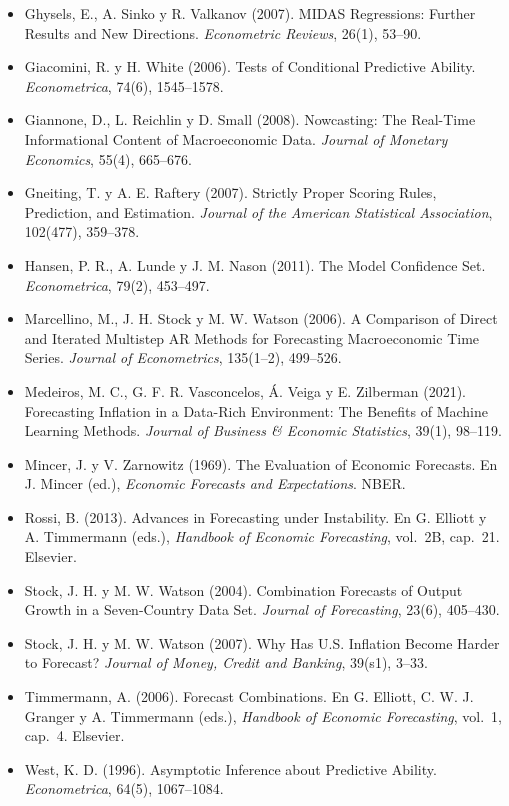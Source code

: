 \documentclass[11pt,a4paper]{article}
\begin{document}
{\begin{itemize}[leftmargin=1.4em,itemsep=1pt,label={}]
\item Ghysels, E., A. Sinko y R. Valkanov (2007). MIDAS Regressions: Further Results and New Directions. \emph{Econometric Reviews}, 26(1), 53--90.
\item Giacomini, R. y H. White (2006). Tests of Conditional Predictive Ability. \emph{Econometrica}, 74(6), 1545--1578.
\item Giannone, D., L. Reichlin y D. Small (2008). Nowcasting: The Real-Time Informational Content of Macroeconomic Data. \emph{Journal of Monetary Economics}, 55(4), 665--676.
\item Gneiting, T. y A. E. Raftery (2007). Strictly Proper Scoring Rules, Prediction, and Estimation. \emph{Journal of the American Statistical Association}, 102(477), 359--378.
\item Hansen, P. R., A. Lunde y J. M. Nason (2011). The Model Confidence Set. \emph{Econometrica}, 79(2), 453--497.
\item Marcellino, M., J. H. Stock y M. W. Watson (2006). A Comparison of Direct and Iterated Multistep AR Methods for Forecasting Macroeconomic Time Series. \emph{Journal of Econometrics}, 135(1--2), 499--526.
\item Medeiros, M. C., G. F. R. Vasconcelos, Á. Veiga y E. Zilberman (2021). Forecasting Inflation in a Data-Rich Environment: The Benefits of Machine Learning Methods. \emph{Journal of Business \& Economic Statistics}, 39(1), 98--119.
\item Mincer, J. y V. Zarnowitz (1969). The Evaluation of Economic Forecasts. En J. Mincer (ed.), \emph{Economic Forecasts and Expectations}. NBER.
\item Rossi, B. (2013). Advances in Forecasting under Instability. En G. Elliott y A. Timmermann (eds.), \emph{Handbook of Economic Forecasting}, vol.~2B, cap.~21. Elsevier.
\item Stock, J. H. y M. W. Watson (2004). Combination Forecasts of Output Growth in a Seven-Country Data Set. \emph{Journal of Forecasting}, 23(6), 405--430.
\item Stock, J. H. y M. W. Watson (2007). Why Has U.S. Inflation Become Harder to Forecast? \emph{Journal of Money, Credit and Banking}, 39(s1), 3--33.
\item Timmermann, A. (2006). Forecast Combinations. En G. Elliott, C. W. J. Granger y A. Timmermann (eds.), \emph{Handbook of Economic Forecasting}, vol.~1, cap.~4. Elsevier.
\item West, K. D. (1996). Asymptotic Inference about Predictive Ability. \emph{Econometrica}, 64(5), 1067--1084.
\end{itemize}
}
\end{document}
